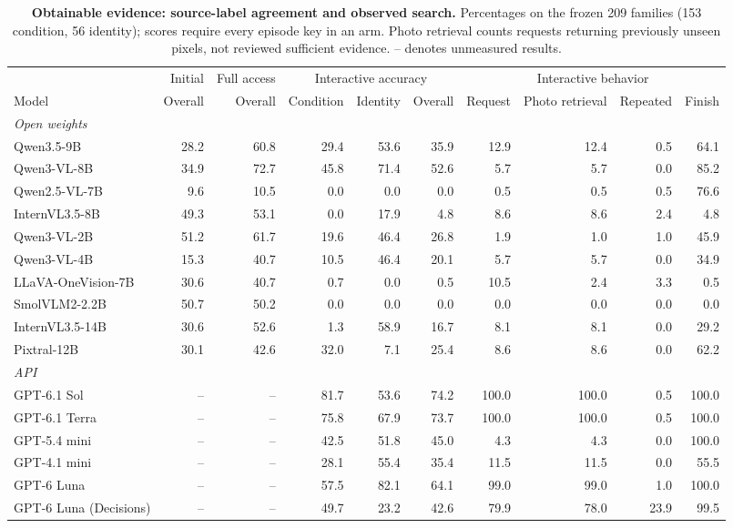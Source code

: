 \begin{table}[t]\centering\small
\setlength{\tabcolsep}{3.2pt}
\caption{\textbf{Obtainable evidence: source-label agreement and observed search.} Percentages on the frozen 209 families (153 condition, 56 identity); scores require every episode key in an arm. Photo retrieval counts requests returning previously unseen pixels, not reviewed sufficient evidence. -- denotes unmeasured results.}
\label{tab:obtainable-all}
\begin{tabular}{@{}lrrrrrrrrr@{}}\toprule
 & Initial & Full access & \multicolumn{3}{c}{Interactive accuracy} & \multicolumn{4}{c}{Interactive behavior}\\
\cmidrule(lr){4-6}\cmidrule(l){7-10}
Model & Overall & Overall & Condition & Identity & Overall & Request & Photo retrieval & Repeated & Finish\\\midrule
\multicolumn{10}{l}{\emph{Open weights}}\\
Qwen3.5-9B & 28.2 & 60.8 & 29.4 & 53.6 & 35.9 & 12.9 & 12.4 & 0.5 & 64.1\\
Qwen3-VL-8B & 34.9 & 72.7 & 45.8 & 71.4 & 52.6 & 5.7 & 5.7 & 0.0 & 85.2\\
Qwen2.5-VL-7B & 9.6 & 10.5 & 0.0 & 0.0 & 0.0 & 0.5 & 0.5 & 0.5 & 76.6\\
InternVL3.5-8B & 49.3 & 53.1 & 0.0 & 17.9 & 4.8 & 8.6 & 8.6 & 2.4 & 4.8\\
Qwen3-VL-2B & 51.2 & 61.7 & 19.6 & 46.4 & 26.8 & 1.9 & 1.0 & 1.0 & 45.9\\
Qwen3-VL-4B & 15.3 & 40.7 & 10.5 & 46.4 & 20.1 & 5.7 & 5.7 & 0.0 & 34.9\\
LLaVA-OneVision-7B & 30.6 & 40.7 & 0.7 & 0.0 & 0.5 & 10.5 & 2.4 & 3.3 & 0.5\\
SmolVLM2-2.2B & 50.7 & 50.2 & 0.0 & 0.0 & 0.0 & 0.0 & 0.0 & 0.0 & 0.0\\
InternVL3.5-14B & 30.6 & 52.6 & 1.3 & 58.9 & 16.7 & 8.1 & 8.1 & 0.0 & 29.2\\
Pixtral-12B & 30.1 & 42.6 & 32.0 & 7.1 & 25.4 & 8.6 & 8.6 & 0.0 & 62.2\\
\multicolumn{10}{l}{\emph{API}}\\
GPT-6.1 Sol & -- & -- & 81.7 & 53.6 & 74.2 & 100.0 & 100.0 & 0.5 & 100.0\\
GPT-6.1 Terra & -- & -- & 75.8 & 67.9 & 73.7 & 100.0 & 100.0 & 0.5 & 100.0\\
GPT-5.4 mini & -- & -- & 42.5 & 51.8 & 45.0 & 4.3 & 4.3 & 0.0 & 100.0\\
GPT-4.1 mini & -- & -- & 28.1 & 55.4 & 35.4 & 11.5 & 11.5 & 0.0 & 55.5\\
GPT-6 Luna & -- & -- & 57.5 & 82.1 & 64.1 & 99.0 & 99.0 & 1.0 & 100.0\\
GPT-6 Luna (Decisions) & -- & -- & 49.7 & 23.2 & 42.6 & 79.9 & 78.0 & 23.9 & 99.5\\
\bottomrule\end{tabular}
\end{table}
